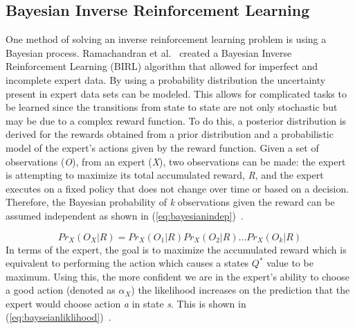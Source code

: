 \documentclass[12pt,american]{report}
\begin{document}
\subsection{Bayesian Inverse Reinforcement Learning}
One method of solving an inverse reinforcement learning problem is using a Bayesian process. Ramachandran et al.~\cite{ramachandran2007bayesian} created a Bayesian Inverse Reinforcement Learning (BIRL) algorithm that allowed for imperfect and incomplete expert data.  By using a probability distribution the uncertainty present in expert data sets can be modeled. This allows for complicated tasks to be learned since the transitions from state to state are not only stochastic but may be due to a complex reward function. To do this, a posterior distribution is derived for the rewards obtained from a prior distribution and a probabilistic model of the expert's actions given by the reward function.  Given a set of observations (\textit{O}), from an expert (\textit{X}), two observations can be made: the expert is attempting to maximize its total accumulated reward, \textit{R}, and the expert executes on a fixed policy that does not change over time or based on a decision. Therefore, the Bayesian probability of \textit{k} observations given the reward can be assumed independent as shown in (\ref{eq:bayesianindep})~\cite{ramachandran2007bayesian}.

\begin{equation}
            \label{eq:bayesianindep}
            Pr_X(O_X|R) = Pr_X(O_1|R)Pr_X(O_2|R)...Pr_X(O_k|R)%
        \end{equation}
In terms of the expert, the goal is to maximize the accumulated reward which is equivalent to performing the action which causes a states \textit{$Q^*$} value to be maximum. Using this, the more confident we are in the expert's ability to choose a good action (denoted as $\alpha_X$) the likelihood increases on the prediction that the expert would choose action \textit{a} in state \textit{s}.  This is shown in (\ref{eq:bayseianliklihood})~\cite{ramachandran2007bayesian}.
\end{document}
